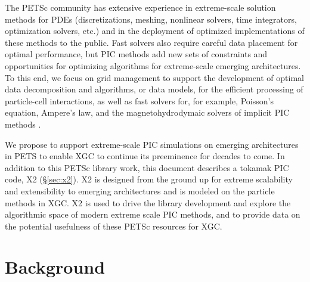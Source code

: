 \documentclass[review]{siamart}
\begin{document}
The PETSc community has extensive experience in extreme-scale solution methods for PDEs (discretizations, meshing, nonlinear solvers, time integrators, optimization solvers, etc.) and in the deployment of optimized implementations of these methods to the public.
Fast solvers also require careful data placement for optimal performance, but PIC methods add new sets of constraints and opportunities for optimizing algorithms for extreme-scale emerging architectures.
To this end, we focus on grid management to support the development of optimal data decomposition and algorithms, or data models,  for the efficient processing of particle-cell interactions, as well as fast solvers for, for example, Poisson's equation, Ampere's law, and the magnetohydrodymaic  solvers of implicit PIC methods \cite{DBLP:journals/cphysics/ChenC15,Adams-10a}.

We propose to support extreme-scale PIC simulations on emerging architectures in PETS to enable XGC to continue its preeminence for decades to come.
In addition to this PETSc library work, this document describes a tokamak PIC code, X2 (\S\ref{sec:x2}).
X2 is designed from the ground up for extreme scalability and extensibility to emerging architectures and is modeled on the particle methods in XGC.
X2 is used to drive the library development and explore the algorithmic space of modern extreme scale PIC methods, and to provide data on the potential usefulness of these PETSc resources for XGC.

\section{Background}
\end{document}
